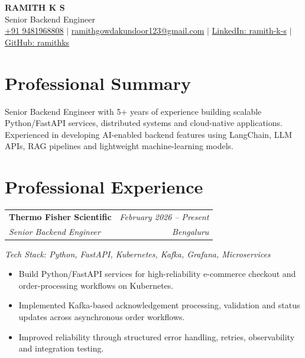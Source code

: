 \documentclass[11pt,a4paper]{article}
\makeatletter
\newcommand{\resumeheading}[4]{
  \noindent
  \begin{tabularx}{\textwidth}{@{}X r@{}}
    \textbf{\color{navyblue}#1} & \textit{\color{lightgray}#2} \\
    \textit{#3} & \textit{\color{lightgray}#4}
  \end{tabularx}\vspace{1pt}
}
\makeatother
\begin{document}
\pagestyle{empty} %

\begin{center}
  {\Huge\bfseries\color{navyblue}RAMITH K S} \\[4pt]
  {\Large\color{darkgray}Senior Backend Engineer} \\[8pt]
  \color{darkgray}
  \href{tel:+919481968808}{+91 9481968808} $|$ 
  \href{mailto:ramithgowdakundoor123@gmail.com}{ramithgowdakundoor123@gmail.com} $|$ 
  \href{https://www.linkedin.com/in/ramith-k-s}{LinkedIn: ramith-k-s} $|$ 
  \href{https://github.com/ramithks}{GitHub: ramithks}
\end{center}

\section{Professional Summary}
\color{darkgray}
{\small Senior Backend Engineer with 5+ years of experience building scalable Python/FastAPI services, distributed systems and cloud-native applications. Experienced in developing AI-enabled backend features using LangChain, LLM APIs, RAG pipelines and lightweight machine-learning models.}

\section{Professional Experience}
\resumeheading{Thermo Fisher Scientific}{February 2026 -- Present}{Senior Backend Engineer}{Bengaluru}
\vspace{2pt}
\textit{\small Tech Stack: Python, FastAPI, Kubernetes, Kafka, Grafana, Microservices}
\vspace{2pt}
\begin{itemize}
\item Build Python/FastAPI services for high-reliability e-commerce checkout and order-processing workflows on Kubernetes.
\item Implemented Kafka-based acknowledgement processing, validation and status updates across asynchronous order workflows.
\item Improved reliability through structured error handling, retries, observability and integration testing.
\end{itemize}

\vspace{3pt}
\end{document}
